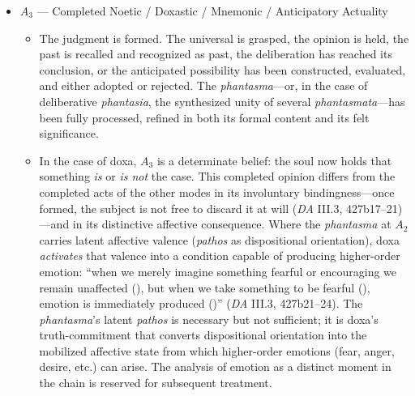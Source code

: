   \begin{itemize}
      \item $A_3$ --- Completed Noetic / Doxastic / Mnemonic / Anticipatory Actuality
      \begin{itemize}
          \item The judgment is formed. The universal is grasped, the opinion is
          held, the past is recalled and recognized as past, the deliberation has
          reached its conclusion, or the anticipated possibility has been
          constructed, evaluated, and either adopted or rejected. The
          \textit{phantasma}---or, in the case of deliberative \textit{phantasia},
          the synthesized unity of several \textit{phantasmata}---has been fully
          processed, refined in both its formal content and its felt significance.

          \item In the case of doxa, $A_3$ is a determinate belief: the soul now
          holds that something \textit{is} or \textit{is not} the case. This
          completed opinion differs from the completed acts of the other modes in
          its involuntary bindingness---once formed, the subject is not free to
          discard it at will (\textit{DA} III.3, 427b17--21)---and in its
          distinctive affective consequence. Where the \textit{phantasma} at $A_2$
          carries latent affective valence (\textit{pathos} as dispositional
          orientation), doxa \textit{activates} that valence into a condition
          capable of producing higher-order emotion: ``when we merely imagine
          something fearful or encouraging we remain unaffected
          (), but when we take something to be fearful
          (), emotion is immediately produced
          ()'' (\textit{DA} III.3, 427b21--24). The
          \textit{phantasma}'s latent \textit{pathos} is necessary but not
          sufficient; it is doxa's truth-commitment that converts dispositional
          orientation into the mobilized affective state from which higher-order
          emotions (fear, anger, desire, etc.) can arise. The analysis of emotion
          as a distinct moment in the chain is reserved for subsequent treatment.



\end{itemize}
\end{itemize}
